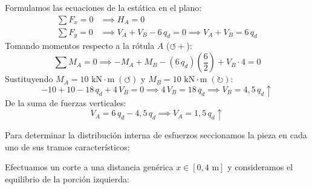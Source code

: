 Formulamos las ecuaciones de la estática en el plano:
\begin{align}
    \sum F_x = 0 & \implies \boxed{H_A = 0} \\[6pt]
    \sum F_y = 0 & \implies V_A + V_B - 6\,q_d = 0 \implies V_A + V_B = 6\,q_d
\end{align}
Tomando momentos respecto a la rótula $A$ ($\circlearrowleft +$):
\begin{equation}
    \sum M_A = 0 \implies -M_A + M_B - (6\,q_d)\left(\frac{6}{2}\right) + V_B \cdot 4 = 0
\end{equation}
Sustituyendo $M_A = 10\text{ kN}\cdot\text{m}\;(\circlearrowleft)$ y $M_B = 10\text{ kN}\cdot\text{m}\;(\circlearrowright)$:
\begin{equation}
    -10 + 10 - 18\,q_d + 4\,V_B = 0 \implies 4\,V_B = 18\,q_d \implies \boxed{V_B = 4{,}5\,q_d\uparrow}
\end{equation}
De la suma de fuerzas verticales:
\begin{equation}
    V_A = 6\,q_d - 4{,}5\,q_d \implies \boxed{V_A = 1{,}5\,q_d\uparrow}
\end{equation}


Para determinar la distribución interna de esfuerzos seccionamos la pieza en cada uno de sus tramos característicos:


Efectuamos un corte a una distancia genérica $x \in [0, 4\text{ m}]$ y consideramos el equilibrio de la porción izquierda:

